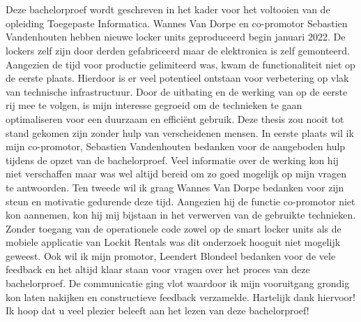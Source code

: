
\chapter*{}%
\label{ch:voorwoord}


Deze bachelorproef wordt geschreven in het kader voor het voltooien van de opleiding Toegepaste Informatica. Wannes Van Dorpe en co-promotor Sebastien Vandenhouten hebben nieuwe locker units geproduceerd begin januari 2022. De lockers zelf zijn door derden gefabriceerd maar de elektronica is zelf gemonteerd. Aangezien de tijd voor productie gelimiteerd was, kwam de functionaliteit niet op de eerste plaats. Hierdoor is er veel potentieel ontstaan voor verbetering op vlak van technische infrastructuur. Door de uitbating en de werking van op de eerste rij mee te volgen, is mijn interesse gegroeid om de technieken te gaan optimaliseren voor een duurzaam en efficiënt gebruik.
\newline
\newline
Deze thesis zou nooit tot stand gekomen zijn zonder hulp van verscheidenen mensen. In eerste plaats wil ik mijn co-promotor, Sebastien Vandenhouten bedanken voor de aangeboden hulp tijdens de opzet van de bachelorproef. Veel informatie over de werking kon hij niet verschaffen maar was wel altijd bereid om zo goed mogelijk op mijn vragen te antwoorden.
\newline
\newline
Ten tweede wil ik graag Wannes Van Dorpe bedanken voor zijn steun en motivatie gedurende deze tijd. Aangezien hij de functie co-promotor niet kon aannemen, kon hij mij bijstaan in het verwerven van de gebruikte technieken. Zonder toegang van de operationele code zowel op de smart locker units als de mobiele applicatie van Lockit Rentals was dit onderzoek hooguit niet mogelijk geweest. 
\newline
\newline
Ook wil ik mijn promotor, Leendert Blondeel bedanken voor de vele feedback en het altijd klaar staan voor vragen over het proces van deze bachelorproef. De communicatie ging vlot waardoor ik mijn vooruitgang grondig kon laten nakijken en constructieve feedback verzamelde. Hartelijk dank hiervoor!
\newline
\newline
Ik hoop dat u veel plezier beleeft aan het lezen van deze bachelorproef!
